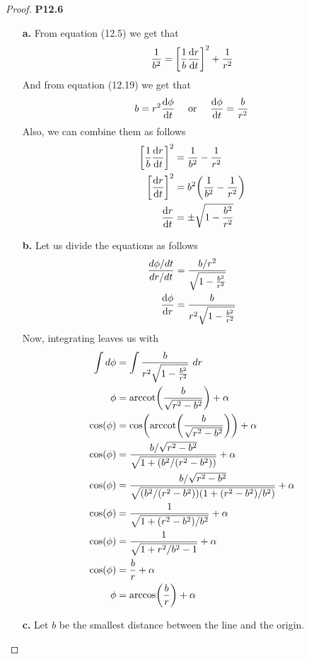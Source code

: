 \documentclass[11pt]{article}
\theoremstyle{definition}
\begin{document}
\cleardoublepage
\begin{proof}{\textbf{P12.6}}
\begin{itemize}
    \item [\textbf{a.}] From equation (12.5) we get that
    \begin{align*}
        \frac{1}{b^2} = \bigg[\frac{1}{b}\dv{r}{t}\bigg]^2 + \frac{1}{r^2}
    \end{align*}
    And from equation (12.19) we get that
    \begin{align*}
        b = r^2\dv{\phi}{t} \quad\text{ or }\quad \dv{\phi}{t} = \frac{b}{r^2}
    \end{align*}
    Also, we can combine them as follows
    \begin{align*}
        \bigg[\frac{1}{b}\dv{r}{t}\bigg]^2 &= \frac{1}{b^2} - \frac{1}{r^2}\\
        \bigg[\dv{r}{t}\bigg]^2 &= b^2\bigg(\frac{1}{b^2} - \frac{1}{r^2}\bigg)\\
        \dv{r}{t} &= \pm \sqrt{1 - \frac{b^2}{r^2}}
    \end{align*}
    \item [\textbf{b.}] Let us divide the equations as follows
    \begin{align*}
        \frac{d\phi/dt}{dr/dt} &= \frac{b/r^2}{\sqrt{1 - \frac{b^2}{r^2}}}\\
        \dv{\phi}{r} &= \frac{b}{r^2\sqrt{1 - \frac{b^2}{r^2}}}
    \end{align*}
    Now, integrating leaves us with 
    \begin{align*}
        \int d\phi &= \int \frac{b}{r^2\sqrt{1 - \frac{b^2}{r^2}}}~dr\\
        \phi &= \arccot(\frac{b}{\sqrt{r^2 - b^2}}) + \alpha\\
        \cos(\phi) &= \cos(\arccot(\frac{b}{\sqrt{r^2 - b^2}})) + \alpha\\
        \cos(\phi)
        &= \frac{b/\sqrt{r^2 - b^2}}{\sqrt{1 + (b^2/(r^2 - b^2))}} + \alpha\\
        \cos(\phi)
        &= \frac{b/\sqrt{r^2 - b^2}}{\sqrt{(b^2/(r^2 - b^2))(1 + (r^2 - b^2)/b^2)}} + \alpha\\
        \cos(\phi) &= \frac{1}{\sqrt{1 + (r^2 - b^2)/b^2}} + \alpha\\
        \cos(\phi) &= \frac{1}{\sqrt{1 + r^2/b^2 - 1}} + \alpha\\
        \cos(\phi) &= \frac{b}{r} + \alpha\\
        \phi &= \arccos(\frac{b}{r}) + \alpha
    \end{align*}
    \item [\textbf{c.}] Let $b$ be the smallest distance between the line and
    the origin.


\end{itemize}
\end{proof}
\end{document}
